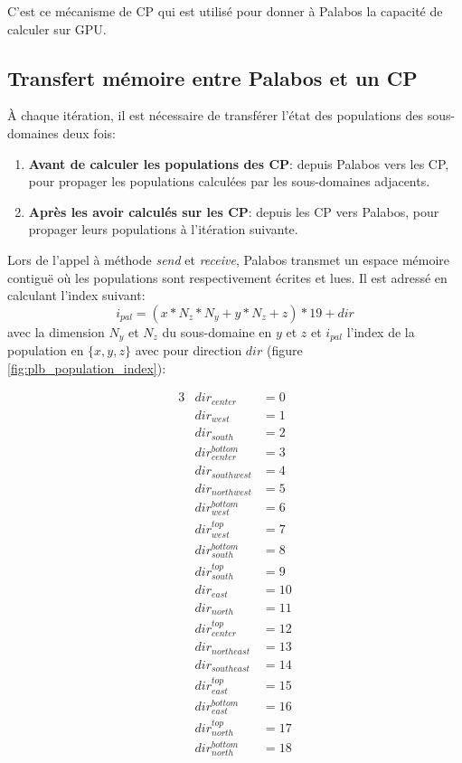 C'est ce mécanisme de \ac{CP} qui est utilisé pour donner à Palabos la capacité de calculer sur \acs{GPU}.

\subsection{Transfert mémoire entre Palabos et un \acs{CP} }\label{title-transfert_palabos_cp}
À chaque itération, il est nécessaire de transférer l'état des populations des sous-domaines deux fois:
\begin{enumerate}
\item \textbf{Avant de calculer les populations des \ac{CP}}: depuis Palabos vers les \ac{CP}, pour propager les populations calculées par les sous-domaines adjacents.
\item \textbf{Après les avoir calculés sur les \ac{CP}}: depuis les \ac{CP} vers Palabos, pour propager leurs populations à l'itération suivante.
\end{enumerate}

Lors de l'appel à méthode \textit{send} et \textit{receive}, Palabos transmet un espace mémoire contiguë où les populations sont respectivement écrites et lues. Il est adressé en calculant l'index suivant:
\begin{equation}
i_{pal} = ( x*N_z*N_y + y*N_z + z) * 19 + dir
\end{equation}
avec la dimension  $N_y$ et $N_z$ du sous-domaine en $y$ et $z$ et $i_{pal}$ l'index de la population en $\{x,y,z\}$ avec pour direction $dir$ (figure \ref{fig:plb_population_index}):

\begin{alignat*}{3}
&dir_{center} &=  0 \\
&dir_{west} &=  1 \\
&dir_{south} &=  2 \\
&dir_{center}^{bottom} &=  3 \\
&dir_{south west} &=  4 \\
&dir_{north west} &=  5 \\
&dir_{west}^{bottom} &=  6 \\
&dir_{west}^{top} &=  7 \\
&dir_{south}^{bottom} &=  8 \\
&dir_{south}^{top} &=  9 \\
&dir_{east} &= 10 \\
&dir_{north} &= 11 \\
&dir_{center}^{top} &= 12 \\
&dir_{north east} &= 13 \\
&dir_{south east} &= 14 \\
&dir_{east}^{top} &= 15 \\
&dir_{east}^{bottom} &= 16 \\
&dir_{north}^{top} &= 17 \\
&dir_{north}^{bottom} &= 18
\end{alignat*}


